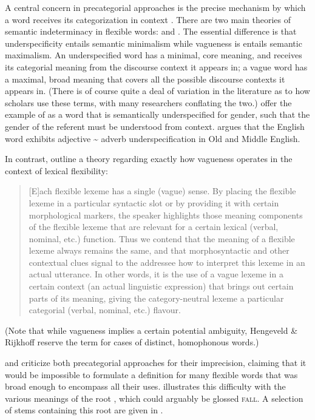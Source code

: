 A central concern in precategorial approaches is the precise mechanism by which a word receives its categorization in context \parencite[Sec.~3.7]{HengeveldRijkhoffSiewierska2004}. There are two main theories of semantic indeterminacy in flexible words:  \parencites{Farrell2001}{RijkhoffLier2013} and  \parencites{Tuggy1993}{HengeveldRijkhoffSiewierska2004}{HengeveldRijkhoff2005}. The essential difference is that underspecificity entails semantic minimalism while vagueness is entails semantic maximalism. An underspecified word has a minimal, core meaning, and receives its categorial meaning from the discourse context it appears in; a vague word has a maximal, broad meaning that covers all the possible discourse contexts it appears in. (There is of course quite a deal of variation in the literature as to how scholars use these terms, with many researchers conflating the two.) \textcite[414]{HengeveldRijkhoff2005} offer the example of  as a word that is semantically underspecified for gender, such that the gender of the referent must be understood from context. \textcite{Denison2018} argues that the English word  exhibits adjective {\textasciitilde} adverb underspecification in Old and Middle English.

In contrast, \textcite[539--541]{HengeveldRijkhoffSiewierska2004} outline a theory regarding exactly how vagueness operates in the context of lexical flexibility:

\blockquote[{\cite[541]{HengeveldRijkhoff2005}}]{[E]ach flexible lexeme has a single (vague) sense. By placing the flexible lexeme in a particular syntactic slot or by providing it with certain morphological markers, the speaker highlights those meaning components of the flexible lexeme that are relevant for a certain lexical (verbal, nominal, etc.) function. Thus we contend that the meaning of a flexible lexeme always remains the same, and that morphosyntactic and other contextual clues signal to the addressee how to interpret this lexeme in an actual utterance. In other words, it is the use of a vague lexeme in a certain context (an actual linguistic expression) that brings out certain parts of its meaning, giving the category-neutral lexeme a particular categorial (verbal, nominal, etc.) flavour.}

\noindent (Note that while vagueness implies a certain potential ambiguity, Hengeveld \& Rijkhoff reserve the term  for cases of distinct, homophonous words.)

\textcite[363--364]{EvansOsada2005} and \textcite{Kihm2017} criticize both precategorial approaches for their imprecision, claiming that it would be impossible to formulate a definition for many flexible words that was broad enough to encompass all their uses. \textcite[87]{Kihm2017} illustrates this difficulty with the various meanings of the  root , which could arguably be glossed \textsc{fall}. A selection of stems containing this root are given in .

